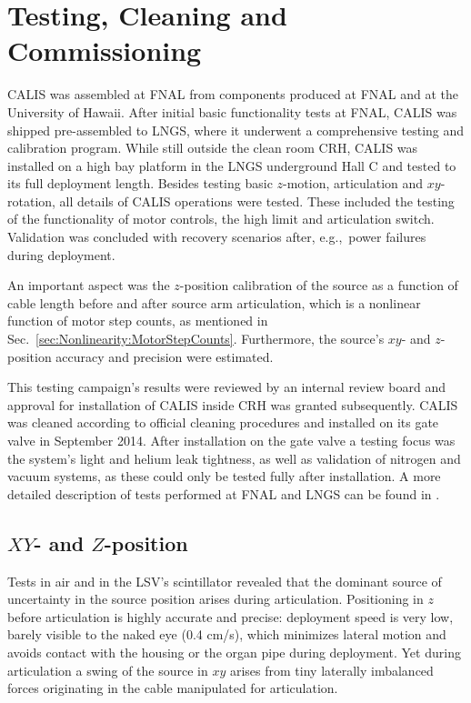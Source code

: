 \section{Testing, Cleaning and Commissioning} \label{sec:Testing}\label{sec:Commissioning}
CALIS was assembled at FNAL from components produced at FNAL and at the University of Hawaii. After initial basic functionality tests at FNAL, CALIS was shipped pre-assembled to LNGS, where it underwent a comprehensive testing and calibration program. While still outside the clean room CRH, CALIS was installed on a high bay platform in the LNGS underground Hall C and tested to its full deployment length. Besides testing basic $z$-motion, articulation and $xy$-rotation, all details of CALIS operations were tested. These included the testing of the functionality of motor controls, the high limit and articulation switch. Validation was concluded with recovery scenarios after, e.g.,~power failures during deployment.

An important aspect was the $z$-position calibration of the source as a function of cable length before and after source arm articulation, which is a nonlinear function of motor step counts, as mentioned in Sec.~\ref{sec:Nonlinearity:MotorStepCounts}. Furthermore, the source's $xy$- and $z$-position accuracy and precision were estimated.

This testing campaign's results were reviewed by an internal review board and approval for installation of CALIS inside CRH was granted subsequently. CALIS was cleaned according to official cleaning procedures and installed on its gate valve in September 2014.
After installation on the gate valve a testing focus was the system's light and helium leak tightness, as well as validation of nitrogen and vacuum systems, as these could only be tested fully after installation. A more detailed description of tests performed at FNAL and LNGS can be found in \cite{thesis:Hackett, thesis:Edkins}.

\subsection*{$XY$- and $Z$-position}
Tests in air and in the LSV's scintillator revealed that the dominant source of uncertainty in the source position arises during articulation. Positioning in $z$ before articulation is highly accurate and precise: deployment speed is very low, barely visible to the naked eye (0.4 cm/s), which minimizes lateral motion and avoids contact with the housing or the organ pipe during deployment. Yet during articulation a swing of the source in $xy$ arises from tiny laterally imbalanced forces originating in the cable manipulated for articulation. 

